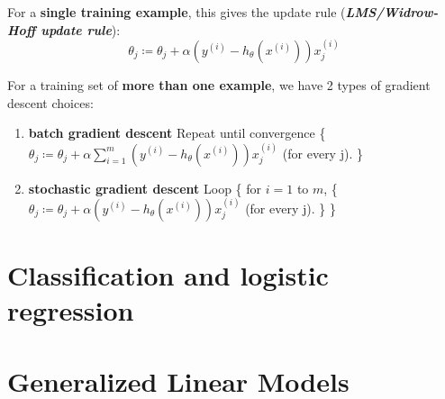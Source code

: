 \documentclass{article}
\begin{document}
For a \textbf{single training example}, this gives the update rule (\emph{\textbf{LMS/Widrow-Hoff update rule}}):
\begin{equation*}
\theta_j\coloneqq\theta_j+\alpha(y^{(i)}-h_\theta(x^{(i)}))x_j^{(i)}
\end{equation*}

For a training set of \textbf{more than one example}, we have 2 types of gradient descent choices:
\begin{enumerate}
    \item \textbf{batch gradient descent}
        \newline Repeat until convergence \{
        \newline $\theta_j\coloneqq\theta_j+\alpha\sum\limits_{i=1}^m(y^{(i)}-h_\theta(x^{(i)}))x_j^{(i)}$ (for every j).
        \newline \}
    \item \textbf{stochastic gradient descent}
        \newline Loop \{
        \newline \hspace*{1cm} for $i=1$ to $m$, \{
        \newline \hspace*{1cm} \hspace{1cm}$\theta_j\coloneqq\theta_j+\alpha(y^{(i)}-h_\theta(x^{(i)}))x_j^{(i)}$ (for every j).
        \newline \hspace*{1cm}\}
        \newline \}
\end{enumerate}

\section{Classification and logistic regression}

\section{Generalized Linear Models}
\end{document}
